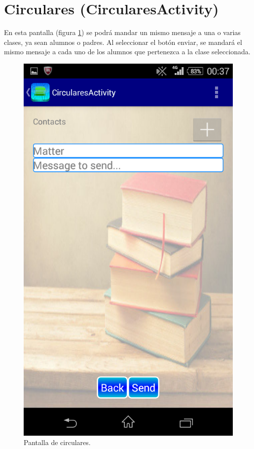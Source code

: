 	\section{Circulares (CircularesActivity)} \label{sec:circulares}
	
		En esta pantalla (figura \ref{fig:circulares}) se podrá mandar un mismo mensaje a una o varias clases, ya sean alumnos o padres. Al seleccionar el botón enviar, se mandará el mismo mensaje a cada uno de los alumnos que pertenezca a la clase seleccionada.
	
		\begin{figure}[h !]
			\centering
			\includegraphics[scale=0.2]{Imagenes/App/Circulares}
			\caption{Pantalla de circulares.}
			\label{fig:circulares}
		\end{figure}
		
